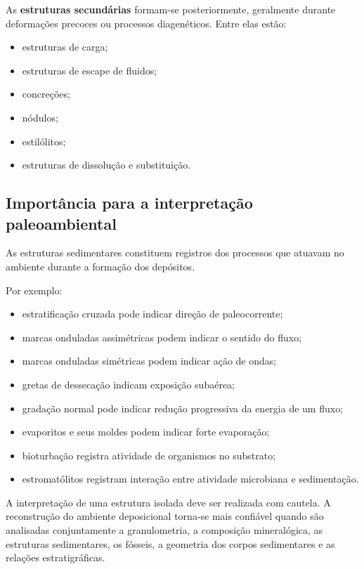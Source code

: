 \documentclass[a4paper,12pt]{article}
\theoremstyle{definition}
\theoremstyle{definition}
\theoremstyle{definition}
\begin{document}
As \textbf{estruturas secundárias} formam-se posteriormente, geralmente durante
deformações precoces ou processos diagenéticos. Entre elas estão:

\begin{itemize}
    \item estruturas de carga;
    \item estruturas de escape de fluidos;
    \item concreções;
    \item nódulos;
    \item estilólitos;
    \item estruturas de dissolução e substituição.
\end{itemize}

\subsection{Importância para a interpretação paleoambiental}

As estruturas sedimentares constituem registros dos processos que atuavam no
ambiente durante a formação dos depósitos.

Por exemplo:

\begin{itemize}
    \item estratificação cruzada pode indicar direção de paleocorrente;
    \item marcas onduladas assimétricas podem indicar o sentido do fluxo;
    \item marcas onduladas simétricas podem indicar ação de ondas;
    \item gretas de dessecação indicam exposição subaérea;
    \item gradação normal pode indicar redução progressiva da energia de um fluxo;
    \item evaporitos e seus moldes podem indicar forte evaporação;
    \item bioturbação registra atividade de organismos no substrato;
    \item estromatólitos registram interação entre atividade microbiana e sedimentação.
\end{itemize}

A interpretação de uma estrutura isolada deve ser realizada com cautela. A
reconstrução do ambiente deposicional torna-se mais confiável quando são
analisadas conjuntamente a granulometria, a composição mineralógica, as
estruturas sedimentares, os fósseis, a geometria dos corpos sedimentares e as
relações estratigráficas.
\end{document}
